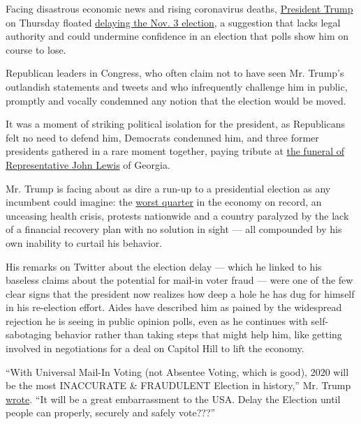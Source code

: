 Facing disastrous economic news and rising coronavirus deaths,
\href{https://www.nytimes.com/interactive/2020/us/elections/donald-trump.html}{President
Trump} on Thursday floated
\href{https://www.nytimes.com/2020/08/04/podcasts/the-daily/mail-in-voting-president-trump.html?action=click\&module=Briefings\&pgtype=Homepage}{delaying
the Nov. 3 election}, a suggestion that lacks legal authority and could
undermine confidence in an election that polls show him on course to
lose.

Republican leaders in Congress, who often claim not to have seen Mr.
Trump's outlandish statements and tweets and who infrequently challenge
him in public, promptly and vocally condemned any notion that the
election would be moved.

It was a moment of striking political isolation for the president, as
Republicans felt no need to defend him, Democrats condemned him, and
three former presidents gathered in a rare moment together, paying
tribute at
\href{https://www.nytimes.com/2020/07/30/us/john-lewis-live-funeral.html}{the
funeral of Representative John Lewis} of Georgia.

Mr. Trump is facing about as dire a run-up to a presidential election as
any incumbent could imagine: the
\href{https://www.nytimes.com/live/2020/07/30/business/stock-market-today-coronavirus}{worst
quarter} in the economy on record, an unceasing health crisis, protests
nationwide and a country paralyzed by the lack of a financial recovery
plan with no solution in sight --- all compounded by his own inability
to curtail his behavior.

His remarks on Twitter about the election delay --- which he linked to
his baseless claims about the potential for mail-in voter fraud --- were
one of the few clear signs that the president now realizes how deep a
hole he has dug for himself in his re-election effort. Aides have
described him as pained by the widespread rejection he is seeing in
public opinion polls, even as he continues with self-sabotaging behavior
rather than taking steps that might help him, like getting involved in
negotiations for a deal on Capitol Hill to lift the economy.

``With Universal Mail-In Voting (not Absentee Voting, which is good),
2020 will be the most INACCURATE \& FRAUDULENT Election in history,''
Mr. Trump
\href{https://twitter.com/realDonaldTrump/status/1288818160389558273?s=20}{wrote}.
``It will be a great embarrassment to the USA. Delay the Election until
people can properly, securely and safely vote???''

